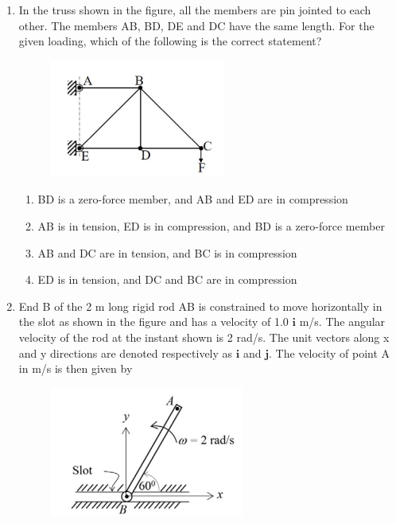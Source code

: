 \documentclass[a4paper,10pt]{article}
\begin{document}
\begin{enumerate}
\item In the truss shown in the figure, all the members are pin jointed to each other. The members AB, BD, DE and DC have the same length. For the given loading, which of the following is the correct statement?
\begin{figure}[H]
    \centering
    \includegraphics[width=0.5\columnwidth]{q69.png}
    \caption*{}
    \label{fig:q69}
\end{figure}

\hfill{}
\begin{enumerate}
    \item BD is a zero-force member, and AB and ED are in compression
    \item AB is in tension, ED is in compression, and BD is a zero-force member
    \item AB and DC are in tension, and BC is in compression
    \item ED is in tension, and DC and BC are in compression
\end{enumerate}

\item End B of the 2 m long rigid rod AB is constrained to move horizontally in the slot as shown in the figure and has a velocity of 1.0 $\mathbf{i}$ m/s. The angular velocity of the rod at the instant shown is 2 rad/s. The unit vectors along x and y directions are denoted respectively as $\mathbf{i}$ and $\mathbf{j}$. The velocity of point A in m/s is then given by
\begin{figure}[H]
    \centering
    \includegraphics[width=0.4\columnwidth]{q70.png}
    \caption*{}
    \label{fig:q70}
\end{figure}


\end{enumerate}
\end{document}
